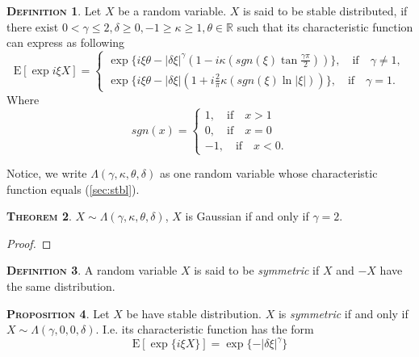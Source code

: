 \documentclass[a4paper, twoside, 11pt]{article}
\theoremstyle{definition}
\newtheorem{definition}{\scshape Definition}[section]
\newtheorem{theorem}[definition]{\scshape Theorem}
\newtheorem{proposition}[definition]{\scshape Proposition}
\begin{document}
\begin{definition}
  Let $X$ be a random variable. $X$ is said to be stable distributed, if there exist $0 < \gamma \le 2, \delta \ge 0, -1 \ge \kappa \ge 1, \theta \in \mathbb{R}$ such that its characteristic function can express as following
  \begin{equation}
	\mathrm{E} [\exp i\xi X] =  \begin{cases} \exp\{i \xi \theta - |\delta\xi|^\gamma(1-i\kappa(sgn(\xi)\tan \frac{\gamma\pi}{2}))\},\hspace{1em}  \text{if}\hspace{1em} \gamma \neq 1, \\
	    \exp\{i \xi \theta - |\delta\xi|(1+i\frac{2}{\pi}\kappa(sgn(\xi)\ln |\xi|))\},\hspace{1em} \text{if}\hspace{1em} \gamma = 1.
	  \end{cases}
	\label{sec:stbl}
  \end{equation}
 Where
$$
 sgn(x) = \begin{cases} 1,\hspace{1em} \text{if}\hspace{1em} x > 1\\
   0,\hspace{1em} \text{if}\hspace{1em} x = 0 \\
   -1,\hspace{1em}\text{if}\hspace{1em} x < 0.
 \end{cases}
  $$
\end{definition}

Notice, we write $\Lambda(\gamma, \kappa, \theta, \delta)$ as one random variable whose characteristic function equals (\ref{sec:stbl}).

\begin{theorem}
  $X \sim \Lambda(\gamma, \kappa, \theta, \delta)$, $X$ is Gaussian if and only if $\gamma = 2$. 
\end{theorem}

\begin{proof}
  
\end{proof}

\begin{definition}
  A random variable $X$ is said to be \emph{symmetric} if $X$ and $-X$ have the same distribution.
\end{definition}

\begin{proposition}
  Let $X$ be have stable distribution. $X$ is  \emph{symmetric} if and only if $X \sim \Lambda(\gamma, 0, 0, \delta)$. I.e. its characteristic function has the form
  \begin{equation}
	\mathrm{E}[\exp\{i \xi X\}] = \exp\{-|\delta\xi|^\gamma\}
  \end{equation}
\end{proposition}
\end{document}
